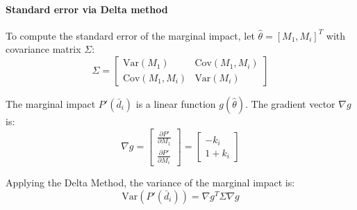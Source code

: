 \documentclass[pdftex,12pt,a4paper]{article}
\begin{document}
\paragraph{Standard error via Delta method}
To compute the standard error of the marginal impact, let $\hat{\theta} = [M_1, M_i]^T$ 
with covariance matrix $\Sigma$:
\begin{equation}
\Sigma = \begin{bmatrix} \text{Var}(M_1) & \text{Cov}(M_1, M_i) \\ \text{Cov}(M_1, M_i) & \text{Var}(M_i) \end{bmatrix}
\end{equation}

The marginal impact $P'(\bar{d}_i)$ is a linear function $g(\hat{\theta})$. 
The gradient vector $\nabla g$ is:
\begin{equation}
\nabla g = \begin{bmatrix} \frac{\partial P'}{\partial M_1} \\ \frac{\partial P'}{\partial M_i} \end{bmatrix} = \begin{bmatrix} -k_i \\ 1 + k_i \end{bmatrix}
\end{equation}

Applying the Delta Method, the variance of the marginal impact is:
\begin{equation}
\text{Var}(P'(\bar{d}_i)) = \nabla g^T \Sigma \nabla g
\end{equation}
%
\end{document}
